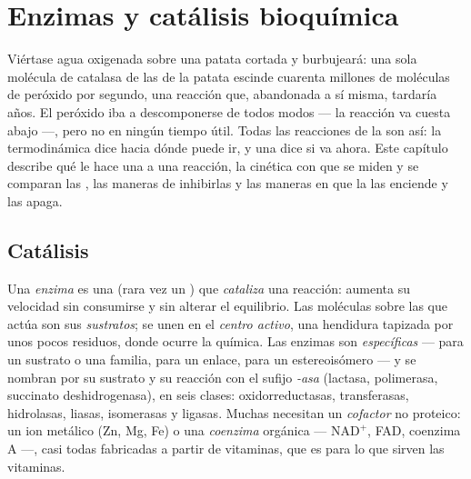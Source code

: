 \chapter{Enzimas y catálisis bioquímica}\label{ch:b1:enzymes}

Viértase agua oxigenada sobre una patata cortada y burbujeará: una sola
molécula de catalasa de las  de la patata escinde cuarenta millones
de moléculas de peróxido por segundo, una reacción que, abandonada a sí
misma, tardaría años. El peróxido iba a descomponerse de todos modos --- la
reacción va cuesta abajo ---, pero no en ningún tiempo útil. Todas las
reacciones de la  son así: la termodinámica dice hacia dónde puede ir,
y una \emph{} dice si va ahora. Este capítulo describe qué le hace una
 a una reacción, la cinética con que se miden y se comparan las
, las maneras de inhibirlas y las maneras en que la  las
enciende y las apaga.

\section{Catálisis}

\begin{definition}\label{def:b1:enzymes:enzyme}
Una \emph{enzima} es una  (rara vez un ) que
\emph{cataliza} una reacción: aumenta su velocidad sin consumirse y sin
alterar el equilibrio. Las moléculas sobre las que actúa son sus
\emph{sustratos}; se unen en el \emph{centro
activo}, una hendidura tapizada por unos pocos
residuos, donde ocurre la química. Las enzimas son \emph{específicas} ---
para un sustrato o una familia, para un enlace, para un estereoisómero ---
y se nombran por su sustrato y su reacción con el sufijo \emph{-asa}
(lactasa,  polimerasa, succinato deshidrogenasa), en seis clases:
oxidorreductasas, transferasas, hidrolasas, liasas, isomerasas y ligasas.
Muchas necesitan un \emph{cofactor} no proteico: un ion
metálico (Zn, Mg, Fe) o una \emph{coenzima} orgánica ---
$\mathrm{NAD^+}$, FAD, coenzima A ---, casi todas fabricadas a partir de
vitaminas, que es para lo que sirven las vitaminas.
\end{definition}

